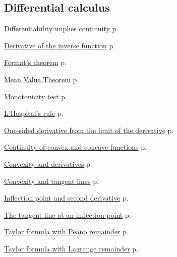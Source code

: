 \documentclass[11pt,a4paper]{article}
\theoremstyle{definition} \newtheorem{definition}{Definition} \theoremstyle{plain} \newtheorem{theorem}{Theorem}
\begin{document}
\subsection*{Differential calculus}
\begin{description}
\item \hyperref[thm:differentiability-continuity]{Differentiability implies continuity} \dotfill p.~\pageref{thm:differentiability-continuity}
\item \hyperref[thm:derivative-inverse]{Derivative of the inverse function} \dotfill p.~\pageref{thm:derivative-inverse}
\item \hyperref[thm:fermat]{Fermat's theorem} \dotfill p.~\pageref{thm:fermat}
\item \hyperref[thm:mean-value]{Mean Value Theorem} \dotfill p.~\pageref{thm:mean-value}
\item \hyperref[thm:monotonicity-test]{Monotonicity test} \dotfill p.~\pageref{thm:monotonicity-test}
\item \hyperref[thm:lhospital]{L'Hospital's rule} \dotfill p.~\pageref{thm:lhospital}
\item \hyperref[thm:one-sided-derivative]{One-sided derivative from the limit of the derivative} \dotfill p.~\pageref{thm:one-sided-derivative}
\item \hyperref[thm:continuity-convex]{Continuity of convex and concave functions} \dotfill p.~\pageref{thm:continuity-convex}
\item \hyperref[thm:convexity-derivatives]{Convexity and derivatives} \dotfill p.~\pageref{thm:convexity-derivatives}
\item \hyperref[thm:convexity-tangent]{Convexity and tangent lines} \dotfill p.~\pageref{thm:convexity-tangent}
\item \hyperref[thm:inflection-second-derivative]{Inflection point and second derivative} \dotfill p.~\pageref{thm:inflection-second-derivative}
\item \hyperref[thm:tangent-inflection]{The tangent line at an inflection point} \dotfill p.~\pageref{thm:tangent-inflection}
\item \hyperref[thm:taylor-peano]{Taylor formula with Peano remainder} \dotfill p.~\pageref{thm:taylor-peano}
\item \hyperref[thm:taylor-lagrange]{Taylor formula with Lagrange remainder} \dotfill p.~\pageref{thm:taylor-lagrange}
\end{description}
\end{document}
